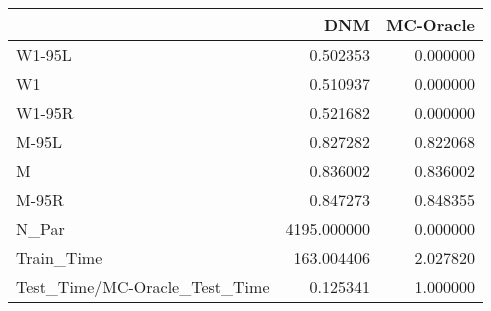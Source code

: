 \begin{tabular}{lrr}
\toprule
{} &          DNM &  MC-Oracle \\
\midrule
W1-95L                        &     0.502353 &   0.000000 \\
W1                            &     0.510937 &   0.000000 \\
W1-95R                        &     0.521682 &   0.000000 \\
M-95L                         &     0.827282 &   0.822068 \\
M                             &     0.836002 &   0.836002 \\
M-95R                         &     0.847273 &   0.848355 \\
N\_Par                         &  4195.000000 &   0.000000 \\
Train\_Time                    &   163.004406 &   2.027820 \\
Test\_Time/MC-Oracle\_Test\_Time &     0.125341 &   1.000000 \\
\bottomrule
\end{tabular}
